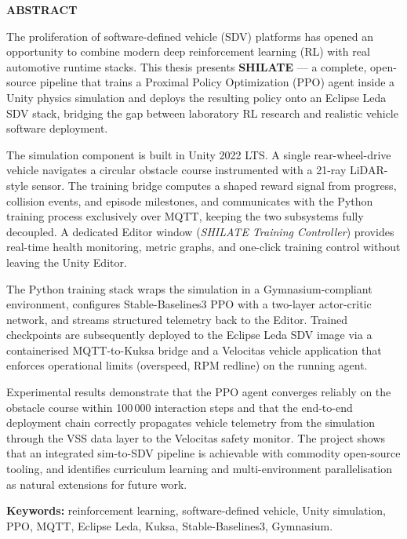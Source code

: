 \thispagestyle{abstractpagestyle}

\vspace*{36pt}

\begin{center}
    \textbf{\fontsize{20pt}{24pt} \selectfont ABSTRACT}
\end{center}

\vspace{24pt}

The proliferation of software-defined vehicle (SDV) platforms has opened an
opportunity to combine modern deep reinforcement learning (RL) with real
automotive runtime stacks. This thesis presents \textbf{SHILATE} --- a
complete, open-source pipeline that trains a Proximal Policy Optimization (PPO)
agent inside a Unity physics simulation and deploys the resulting policy onto an
Eclipse Leda SDV stack, bridging the gap between laboratory RL research and
realistic vehicle software deployment.

The simulation component is built in Unity 2022 LTS. A single rear-wheel-drive
vehicle navigates a circular obstacle course instrumented with a 21-ray
LiDAR-style sensor. The training bridge computes a shaped reward signal from
progress, collision events, and episode milestones, and communicates with the
Python training process exclusively over MQTT, keeping the two subsystems fully
decoupled. A dedicated Editor window (\textit{SHILATE Training Controller})
provides real-time health monitoring, metric graphs, and one-click training
control without leaving the Unity Editor.

The Python training stack wraps the simulation in a Gymnasium-compliant
environment, configures Stable-Baselines3 PPO with a two-layer actor-critic
network, and streams structured telemetry back to the Editor. Trained
checkpoints are subsequently deployed to the Eclipse Leda SDV image via a
containerised MQTT-to-Kuksa bridge and a Velocitas vehicle application that
enforces operational limits (overspeed, RPM redline) on the running agent.

Experimental results demonstrate that the PPO agent converges reliably on the
obstacle course within 100\,000 interaction steps and that the end-to-end
deployment chain correctly propagates vehicle telemetry from the simulation
through the VSS data layer to the Velocitas safety monitor. The project shows
that an integrated sim-to-SDV pipeline is achievable with commodity open-source
tooling, and identifies curriculum learning and multi-environment
parallelisation as natural extensions for future work.

\textbf{Keywords:} reinforcement learning, software-defined vehicle, Unity
simulation, PPO, MQTT, Eclipse Leda, Kuksa, Stable-Baselines3, Gymnasium.

\vfill
